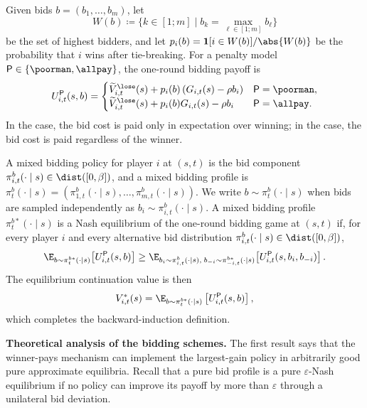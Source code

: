 Given bids \(b=(b_1,\ldots,b_m)\), let
\begin{equation}
	W(b)\coloneqq \{k\in [1;m]\mid b_k=\max_{\ell\in[1;m]}b_\ell\}
\end{equation}
be the set of highest bidders, and let \(p_i(b)=\mathbf{1}[i\in W(b)]/\abs{W(b)}\) be the probability that \(i\) wins after tie-breaking.
For a penalty model \(\mathsf{P}\in\{\poorman,\allpay\}\), the one-round bidding payoff is
\begin{equation}
	U^{\mathsf{P}}_{i,t}(s,b)
	=
	\begin{cases}
		\widetilde V^{\lose}_{i,t}(s)+p_i(b)\left(G_{i,t}(s)-\rho b_i\right) & \mathsf{P}=\poorman,\\
		\widetilde V^{\lose}_{i,t}(s)+p_i(b)G_{i,t}(s)-\rho b_i & \mathsf{P}=\allpay.
	\end{cases}
\end{equation}
In the \poorman case, the bid cost is paid only in expectation over winning; in the \allpay case, the bid cost is paid regardless of the winner.

A mixed bidding policy for player \(i\) at \((s,t)\) is the bid component \(\pi^b_{i,t}(\cdot\mid s)\in\dist([0,\beta])\), and a mixed bidding profile is \(\pi^b_t(\cdot\mid s)=(\pi^b_{1,t}(\cdot\mid s),\ldots,\pi^b_{m,t}(\cdot\mid s))\).
We write \(b\sim\pi^b_t(\cdot\mid s)\) when bids are sampled independently as \(b_i\sim\pi^b_{i,t}(\cdot\mid s)\).
A mixed bidding profile \(\pi^{b*}_t(\cdot\mid s)\) is a Nash equilibrium of the one-round bidding game at \((s,t)\) if, for every player \(i\) and every alternative bid distribution \(\pi^b_{i,t}(\cdot\mid s)\in\dist([0,\beta])\),
\begin{equation}
	\E_{b\sim\pi^{b*}_t(\cdot\mid s)}\!\left[U^{\mathsf{P}}_{i,t}(s,b)\right]
	\geq
	\E_{b_i\sim\pi^b_{i,t}(\cdot\mid s),\; b_{-i}\sim\pi^{b*}_{-i,t}(\cdot\mid s)}\!\left[U^{\mathsf{P}}_{i,t}(s,b_i,b_{-i})\right].
\end{equation}
The equilibrium continuation value is then
\begin{equation}
	V^*_{i,t}(s)
	=
	\E_{b\sim \pi^{b*}_t(\cdot\mid s)}\left[U^{\mathsf{P}}_{i,t}(s,b)\right],
\end{equation}
which completes the backward-induction definition.

\smallskip
\noindent\textbf{Theoretical analysis of the bidding schemes.}
The first result says that the winner-pays mechanism can implement the largest-gain policy in arbitrarily good pure approximate equilibria.
Recall that a pure bid profile is a pure \(\varepsilon\)-Nash equilibrium if no policy can improve its payoff by more than \(\varepsilon\) through a unilateral bid deviation.

